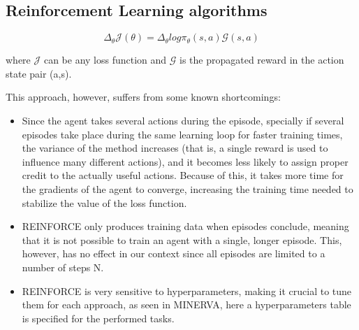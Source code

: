 \subsection{Reinforcement Learning algorithms}
\label{sec:spacerl-RLalgorithms}



\begin{equation}
\label{eq:reinforce}
    \Delta_{\theta}\mathcal{J}(\theta) =\Delta_{\theta}log\pi_{\theta}(s,a)\mathcal{G}(s,a) 
\end{equation}

where $\mathcal{J}$ can be any loss function and $\mathcal{G}$ is the propagated reward in the action state pair (a,s).

This approach, however, suffers from some known shortcomings:
\begin{itemize}
    \item {Since the agent takes several actions during the episode, specially if several episodes take place during the same learning loop for faster training times, the variance of the method increases (that is, a single reward is used to influence many different actions), and it becomes less likely to assign proper credit to the actually useful actions. Because of this, it takes more time for the gradients of the agent to converge, increasing the training time needed to stabilize the value of the loss function.}
    \item {REINFORCE only produces training data when episodes conclude, meaning that it is not possible to train an agent with a single, longer episode. This, however, has no effect in our context since all episodes are limited to a number of steps N.}
    \item {REINFORCE is very sensitive to hyperparameters, making it crucial to tune them for each approach, as seen in MINERVA\cite{das2017go}, here a hyperparameters table is specified for the performed tasks.}
\end{itemize}

